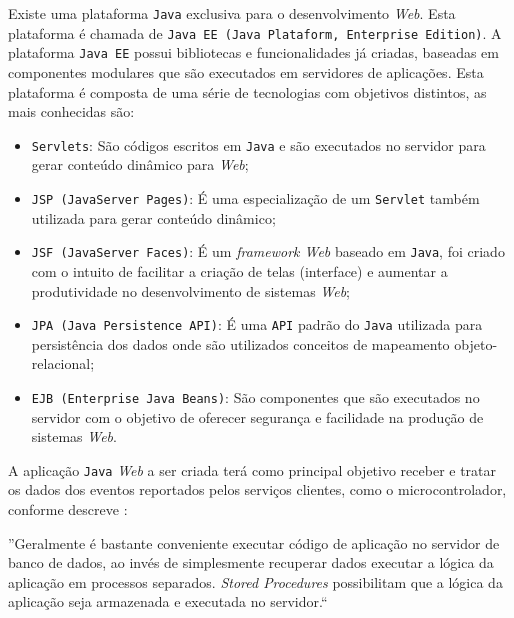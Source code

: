 Existe uma plataforma \texttt{Java} exclusiva para o desenvolvimento \textit{Web}. Esta plataforma é chamada de \texttt{Java EE 
(Java Plataform, Enterprise Edition)}. A plataforma \texttt{Java EE} possui bibliotecas e funcionalidades já criadas, 
baseadas em componentes modulares que são executados em servidores de aplicações. Esta plataforma é composta 
de uma série de tecnologias com objetivos distintos, as mais conhecidas são:

\begin{itemize}

	\item \texttt{Servlets}: São códigos escritos em \texttt{Java} e são executados no servidor para gerar conteúdo dinâmico para \textit{Web};
	\item \texttt{JSP (JavaServer Pages)}: É uma especialização de um \texttt{Servlet} também utilizada para gerar conteúdo dinâmico;
	\item \texttt{JSF (JavaServer Faces)}: É um \textit{framework Web} baseado em \texttt{Java}, foi criado com o intuito de facilitar a criação 
	de telas (interface) e aumentar a produtividade no desenvolvimento de sistemas \textit{Web};
	\item \texttt{JPA (Java Persistence API)}: É uma \texttt{API} padrão do \texttt{Java} utilizada para persistência dos dados onde são utilizados 
	conceitos de mapeamento objeto-relacional;
	\item \texttt{EJB (Enterprise Java Beans)}: São componentes que são executados no servidor com o objetivo de oferecer segurança 
	e facilidade na produção de sistemas \textit{Web}.

\end{itemize}

A aplicação \texttt{Java} \textit{Web} a ser criada terá como principal objetivo receber e tratar os dados dos eventos reportados pelos
serviços clientes, como o microcontrolador, conforme descreve \cite{marcilio2004}: 

\begin{citacao}
''Geralmente é bastante conveniente executar código de aplicação no servidor de
banco de dados, ao invés de simplesmente recuperar dados executar a lógica da
aplicação em processos separados. \textit{Stored Procedures} possibilitam que a lógica da
aplicação seja armazenada e executada no servidor.``
\end{citacao}

